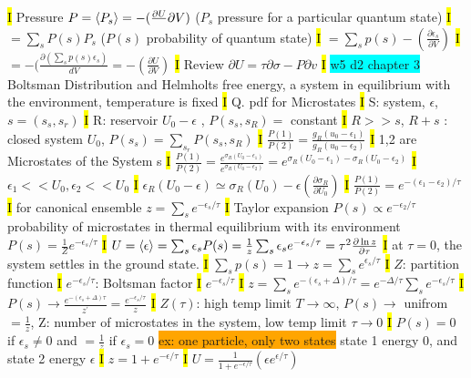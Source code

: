 \documentclass[fontsize=4pt]{scrartcl}
\begin{document}
\hl{I}
Pressure $P=\expval{P_s} = -(\frac{\partial U}{}\partial V)$ ($P_s$ pressure for a particular quantum state)
\hl{I}
$ = \sum_{s} P(s)P_s$ ($P(s)$ probability of quantum state)
\hl{I}
$=\sum_{s} p(s) -(\frac{\partial \epsilon_s}{\partial V})$
\hl{I}
$=-(\frac{\partial(\sum_{s} p(s) \epsilon_s)}{dV} = -(\frac{\partial U}{\partial V})$
\hl{I}
Review $\partial U = \tau \partial \sigma - P \partial v$
\hl{I}
\colorbox{Cyan}{w5 d2 chapter 3}
Boltsman Distribution and Helmholts free energy, a system in equilibrium with the environment, temperature is fixed
\hl{I}
Q. pdf for Microstates
\hl{I}
S: system, $\epsilon$, $s = (s_s,s_r)$
\hl{I}
R: reservoir $U_0 - \epsilon$ , $P(s_s , s_R) =$ constant
\hl{I}
$R>>s$, $R+s$ : closed system $U_0$, $P(s_s)=\sum_{s_r}P(s_s,s_R)$
\hl{I}
$\frac{P(1)}{P(2)} = \frac{g_R(u_0 - \epsilon_1)}{g_R(u_0 - \epsilon_2)}$
\hl{I}
1,2 are Microstates of the System s
\hl{I}
$\frac{P(1)}{P(2)} = \frac{e^{\sigma_R (U_0 - \epsilon_1)}}{e^{\sigma_R (U_0 - \epsilon_2)}} = e^{\sigma_R (U_0 - \epsilon_1) - \sigma_R (U_0 - \epsilon_2)} $
\hl{I}
$\epsilon_1 << U_0, \epsilon_2 << U_0$
\hl{I}
$\epsilon_R (U_0 - \epsilon) \simeq \sigma_R (U_0) - \epsilon (\frac{\partial \sigma_R}{\partial U_0})$
\hl{I}
$\frac{P(1)}{P(2)} = e^{-(\epsilon_1 - \epsilon_2) / \tau}$
\hl{I}
\colorbox{RubineRed}{for canonical ensemble} 
$z = \sum_s e^{-\epsilon_s / \tau}$
\hl{I}
Taylor expansion $P(s) \propto e^{-\epsilon_2 /\tau}$
\colorbox{RubineRed}{probability of microstates in thermal equilibrium with its environment} 
$P(s) = \frac{1}{Z}e^{-\epsilon_s / \tau}$
\hl{I}
$U = \expval{\epsilon} = \sum_s \epsilon_s P(s) = \frac{1}{z} \sum_s \epsilon_s e^{-\epsilon_s / \tau} = \tau^2 \frac{\partial \ln z}{\partial \tau}$
\hl{I}
at $\tau = 0$, the system settles in the ground state.
\hl{I}
$\sum_s p(s) =1 \rightarrow z = \sum_s e^{\epsilon_s /\tau}$
\hl{I}
$Z$: partition function
\hl{I}
$e^{-\epsilon_s /\tau}$: Boltsman factor
\hl{I}
$e^{-\epsilon_s /\tau}$
\hl{I}
$z = \sum_s e^{-(\epsilon_s +\Delta)/\tau} = e^{-\Delta / \tau} \sum_s e^{-\epsilon_s / \tau}$
\hl{I}
$P(s) \rightarrow \frac{e^{-(\epsilon_s + \Delta)\tau}}{z^{\prime}} = \frac{e^{-\epsilon_s /\tau}}{z}$
\hl{I}
$Z(\tau)$: high temp limit $T \rightarrow \infty$, $P(s) \rightarrow$ unifrom $=\frac{1}{z}$, Z: number of microstates in the system, low temp limit $\tau \rightarrow 0$
\hl{I}
$P(s) = 0 $ if $\epsilon_s \neq 0$ and $=\frac{1}{z} $ if $\epsilon_s = 0$
\colorbox{Orange}{ex: one particle, only two states}
state 1 energy 0, and state 2 energy $\epsilon$
\hl{I}
$z = 1 + e^{-\epsilon/\tau}$
\hl{I}
$U = \frac{1}{1+e^{-\epsilon/\tau}} (\epsilon e^{\epsilon/\tau})$
\end{document}
